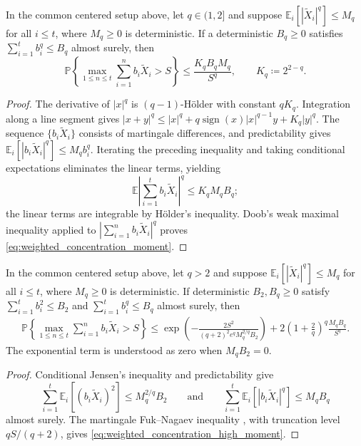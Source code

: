 \documentclass{article}
\begin{document}
\begin{lemma}
\label{lem:weighted_concentration_unified}
In the common centered setup above, let
\(q\in(1,2]\) and suppose
\(\mathbb E_i[|\widetilde X_i|^q]\le M_q\) for all \(i\le t\),
where \(M_q\ge0\) is deterministic. If a deterministic
\(B_q\ge0\) satisfies \(\sum_{i=1}^t b_i^q\le B_q\) almost surely,
then
\begin{equation}\label{eq:weighted_concentration_moment}
\mathbb P\left\{
\max_{1\le n\le t}\sum_{i=1}^n b_i\widetilde X_i>S
\right\}
\le
\frac{K_qB_qM_q}{S^q},
\qquad K_q\coloneqq 2^{2-q}.
\end{equation}
\end{lemma}
\begin{proof}
The derivative of \(|x|^q\) is \((q-1)\)-H\"older with constant
\(qK_q\). Integration along a line segment gives
\(|x+y|^q\le|x|^q+q\operatorname{sign}(x)|x|^{q-1}y+K_q|y|^q\).
The sequence \(\{b_i\widetilde X_i\}\) consists of martingale
differences, and predictability gives
\(\mathbb E_i[|b_i\widetilde X_i|^q]\le M_qb_i^q\).
Iterating the preceding inequality and taking conditional expectations
eliminates the linear terms, yielding
\[
\mathbb E\left|\sum_{i=1}^t b_i\widetilde X_i\right|^q
\le K_qM_qB_q;
\]
the linear terms are integrable by H\"older's inequality. Doob's weak
maximal inequality applied to
\(|\sum_{i=1}^n b_i\widetilde X_i|^q\) proves
\eqref{eq:weighted_concentration_moment}.
\end{proof}

\begin{lemma}
\label{lem:weighted_concentration_high_moment}
In the common centered setup above, let \(q>2\)
and suppose \(\mathbb E_i[|\widetilde X_i|^q]\le M_q\) for all
\(i\le t\), where \(M_q\ge0\) is deterministic. If deterministic
\(B_2,B_q\ge0\) satisfy \(\sum_{i=1}^t b_i^2\le B_2\) and
\(\sum_{i=1}^t b_i^q\le B_q\) almost surely, then
\begin{equation}\label{eq:weighted_concentration_high_moment}
\begin{aligned}
\mathbb P\left\{\max_{1\le n\le t}
\sum_{i=1}^n b_i\widetilde X_i>S\right\}
\le\exp\!\left(-\frac{2S^2}{(q+2)^2e^qM_q^{2/q}B_2}\right)+2\left(1+\frac2q\right)^q\frac{M_qB_q}{S^q}.
\end{aligned}
\end{equation}
The exponential term is understood as zero when \(M_qB_2=0\).
\end{lemma}
\begin{proof}
Conditional Jensen's inequality and predictability give
\[
\sum_{i=1}^t\mathbb E_i[(b_i\widetilde X_i)^2]
\le M_q^{2/q}B_2
\qquad\text{and}\qquad
\sum_{i=1}^t\mathbb E_i[|b_i\widetilde X_i|^q]\le M_qB_q
\]
almost surely. The martingale Fuk--Nagaev inequality
\cite[Theorem~2.4]{FAN2017538}, with truncation level \(qS/(q+2)\),
gives \eqref{eq:weighted_concentration_high_moment}.
\end{proof}
\end{document}
